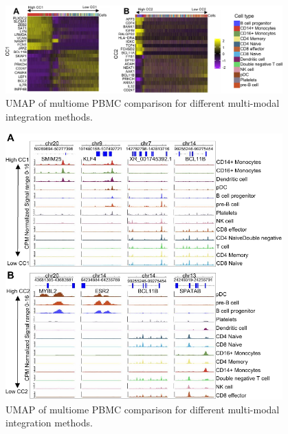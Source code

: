 \begin{figure}[!ht]
	\centering
	\includegraphics[width=0.95\textwidth]{CC_Genes/fig}
	\vspace{0.1cm}
	\caption[UMAP of multiome PBMC comparison for different multi-modal integration methods.]{UMAP of multiome PBMC comparison for different multi-modal integration methods.}
	\label{fig:CC_Genes}
\end{figure}



\begin{figure}[!ht]
	\centering
	\includegraphics[width=0.95\textwidth]{CC_Peaks/fig}
	\vspace{0.1cm}
	\caption[UMAP of multiome PBMC comparison for different multi-modal integration methods.]{UMAP of multiome PBMC comparison for different multi-modal integration methods.}
	\label{fig:CC_Peaks}
\end{figure}





